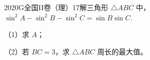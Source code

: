 
\begin{problem}{2020}{G}{全国II卷（理）}{17}{解三角形}
$ \triangle ABC $ 中，$ \sin^2 A - \sin^2 B - \sin^2 C = \sin B \sin C $.

（1）求 $ A $；

（2）若 $ BC = 3 $，求 $ \triangle ABC $ 周长的最大值。
\end{problem}

\begin{answer}

\end{answer}

\begin{solutions}

\end{solutions}